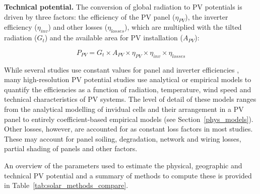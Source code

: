 \textbf{Technical potential.} The conversion of global radiation to PV potentials is driven by three factors: the efficiency of the PV panel ($\eta_{PV}$), the inverter efficiency ($\eta_\mathit{inv}$) and other losses ($\eta_\mathit{losses}$), which are multiplied with the tilted radiation ($G_t$) and the available area for PV installation ($A_{PV}$):

\begin{equation}
    P_{PV} = G_t \times A_{PV} \times \eta_{PV} \times \eta_\mathit{inv} \times \eta_\mathit{losses}
\end{equation}

While several studies use constant values for panel and inverter efficiencies \cite{assouline_quantifying_2017,wegertseder_combining_2016,romero_rodriguez_assessment_2017,ordonez_analysis_2010,hong_development_2017}, many high-resolution PV potential studies use analytical or empirical models to quantify the efficiencies as a function of radiation, temperature, wind speed and technical characteristics of PV systems. The level of detail of these models ranges from the analytical modelling of invidual cells and their arrangement in a PV panel \cite{buffat_scalable_2018} to entirely coefficient-based empirical models \cite{mainzer_assessment_2017} (see Section~\ref{phys_models}). Other losses, however, are accounted for as constant loss factors in most studies. These may account for panel soiling, degradation, network and wiring losses, partial shading of panels and other factors.

An overview of the parameters used to estimate the physical, geographic and technical PV potential and a summary of methods to compute these is provided in Table~\ref{tab:solar_methods_compare}.

